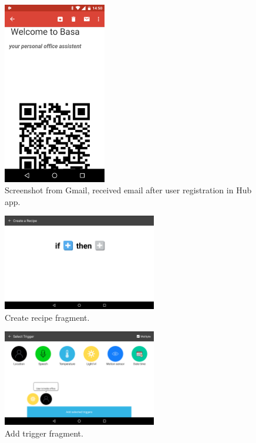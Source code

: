 \begin{figure}[H]
\centering
\includegraphics[width=0.4\textwidth]{Figures/email_basa}
\caption{Screenshot from Gmail, received email after user registration in Hub app.}
\label{email_screenshot}
\end{figure}


\begin{figure}[H]
\centering
\includegraphics[width=0.6\textwidth]{Figures/create_recipe}
\caption{Create recipe fragment.}
\label{create_recipe}
\end{figure}

\begin{figure}[H]
\centering
\includegraphics[width=0.6\textwidth]{Figures/screen_trigger}
\caption{Add trigger fragment.}
\label{screen_triggers}
\end{figure}

